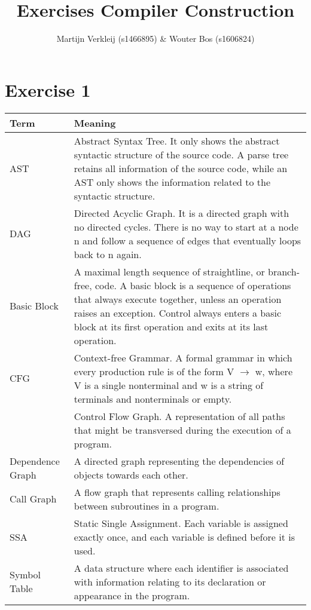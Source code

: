 \documentclass[11pt]{article} %
\title{Exercises Compiler Construction}
\author{Martijn Verkleij (s1466895) \& Wouter Bos (s1606824)}
\begin{document}
\maketitle

\section*{Exercise 1}

\bgroup
\def\arraystretch{1.5}
\begin{tabular}{lp{10cm}}
\textbf{Term} & \textbf{Meaning} \\
\hline
AST
& Abstract Syntax Tree. It only shows the abstract syntactic structure of the source code. A parse tree retains all information of the source code, while an AST only shows the information related to the syntactic structure. \\

DAG
& Directed Acyclic Graph. It is a directed graph with no directed cycles. There is no way to start at a node n and follow a sequence of edges that eventually loops back to n again. \\

Basic Block
& A maximal length sequence of straightline, or branch-free, code. A basic block is a sequence of operations that always execute together, unless an operation raises an exception. Control always enters a basic block at its first operation and exits at its last operation. \\

CFG
& Context-free Grammar. A formal grammar in which every production rule is of the form V $\rightarrow$ w, where V is a single nonterminal and w is a string of terminals and nonterminals or empty. \\

& Control Flow Graph. A representation of all paths that might be transversed during the execution of a program. \\

Dependence Graph
& A directed graph representing the dependencies of objects towards each other. \\

Call Graph
& A flow graph that represents calling relationships between subroutines in a program. \\

SSA
& Static Single Assignment. Each variable is assigned exactly once, and each variable is defined before it is used. \\

Symbol Table
& A data structure where each identifier is associated with information relating to its declaration or appearance in the program. \\

\hline
\end{tabular}
\egroup
\end{document}
